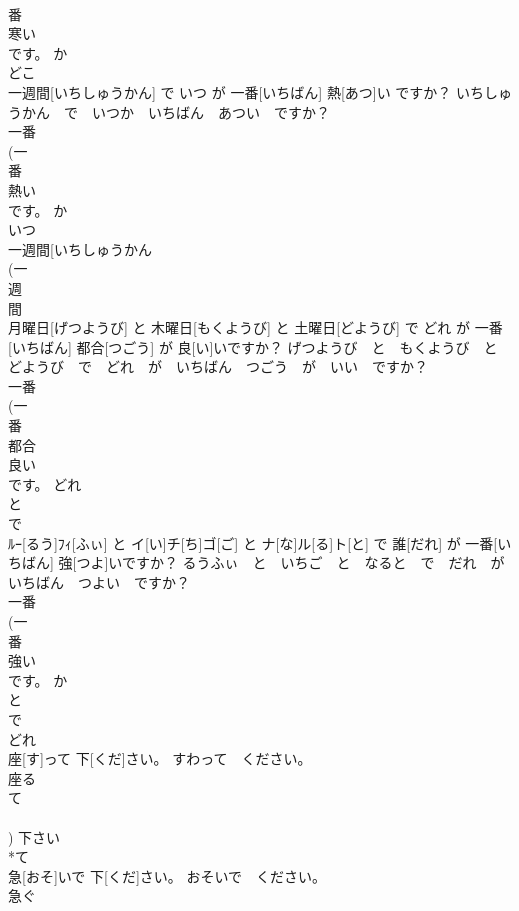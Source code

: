 \documentclass[8pt]{extreport}
\begin{document}
\begin{CJK}{UTF8}{min}
\\	番 
\\	寒い 
\\	です。	か 
\\	どこ 
\\	一週間[いちしゅうかん] で いつ が 一番[いちばん] 熱[あつ]い ですか？	いちしゅうかん　で　いつか　いちばん　あつい　ですか？	
\\	一番 
\\	(一 
\\	番 
\\	熱い 
\\	です。	か 
\\	いつ 
\\	一週間[いちしゅうかん 
\\	(一 
\\	週 
\\	間 
\\	月曜日[げつようび] と 木曜日[もくようび] と 土曜日[どようび] で どれ が 一番[いちばん] 都合[つごう] が 良[い]いですか？	げつようび　と　もくようび　と　どようび　で　どれ　が　いちばん　つごう　が　いい　ですか？	
\\	一番 
\\	(一 
\\	番 
\\	都合 
\\	良い 
\\	です。	どれ 
\\	と 
\\	で 
\\	ﾙｰ[るう]ﾌｨ[ふぃ] と イ[い]チ[ち]ゴ[ご] と ナ[な]ル[る]ト[と] で 誰[だれ] が 一番[いちばん] 強[つよ]いですか？	るうふぃ　と　いちご　と　なると　で　だれ　が　いちばん　つよい　ですか？	
\\	一番 
\\	(一 
\\	番 
\\	強い 
\\	です。	か 
\\	と 
\\	で 
\\	どれ 
\\	座[す]って 下[くだ]さい。	すわって　ください。	
\\	座る 
\\	て 
\\	[る/つ/う] 
\\	[って])	下さい 
\\	*て 
\\	急[おそ]いで 下[くだ]さい。	おそいで　ください。	
\\	急ぐ 

\end{CJK}
\end{document}
